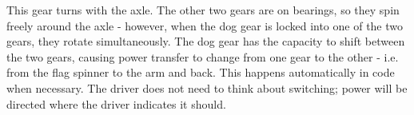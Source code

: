 This gear turns with the axle. The other two gears are on bearings, so they spin freely around the axle - however, when the dog gear is locked into one of the two gears, they rotate simultaneously. The dog gear has the capacity to shift between the two gears, causing power transfer to change from one gear to the other - i.e. from the flag spinner to the arm and back. This happens automatically in code when necessary. The driver does not need to think about switching; power will be directed where the driver indicates it should.

